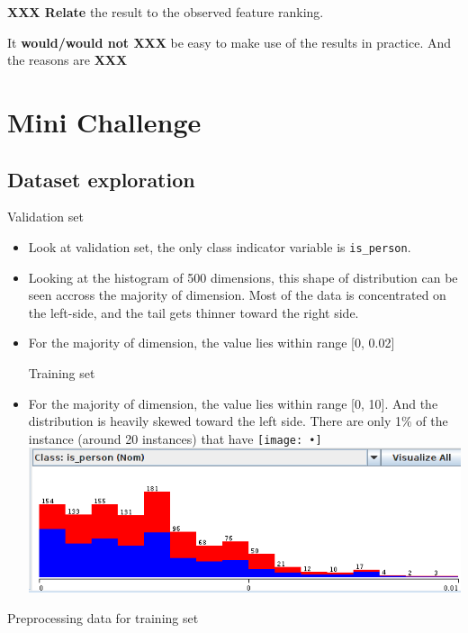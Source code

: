 \documentclass[12pt,journal,compsoc]{IEEEtran}
\begin{document}
\textbf{XXX Relate} the result to the observed feature ranking.

It \textbf{would/would not XXX} be easy to make use of the results in practice. And the reasons are \textbf{XXX}

\section{Mini Challenge}
\subsection*{Dataset exploration}
Validation set

\begin{itemize}
\item Look at validation set, the only class indicator variable is \texttt{is\_person}.

\item Looking at the histogram of 500 dimensions, this shape of distribution can be seen accross the majority of dimension. Most of the data is concentrated on the left-side, and the tail gets thinner toward the right side.

\item For the majority of dimension, the value lies within range [0, 0.02]

Training set
\item For the majority of dimension, the value lies within range [0, 10]. And the distribution is heavily skewed toward the left side. There are only 1\% of the instance (around 20 instances) that have 
\texttt{[image: •]}
\includegraphics[scale=0.3]{264_val}
\end{itemize}



Preprocessing data for training set

\end{document}

